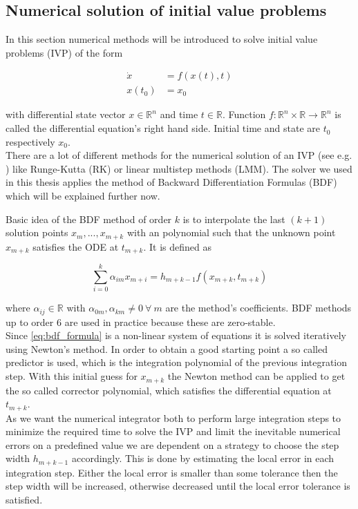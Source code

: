 \documentclass{scrartcl}[12pt, halfparskip]
\numberwithin{equation}{section}
\numberwithin{figure}{section}
\numberwithin{table}{section}
\begin{document}
\subsection{Numerical solution of initial value problems}
\label{sec:theory_ODE_solver_BDF}

In this section numerical methods will be introduced to solve initial value problems (IVP) of the form

\begin{align}
	\dot{x} & = f(x(t),t) \\
	x(t_0) & = x_0 \nonumber
\end{align}

with differential state vector $x \in \mathbb{R}^n$ and time $t \in \mathbb{R}$. Function $f: \mathbb{R}^n \times \mathbb{R} \rightarrow \mathbb{R}^n$ is called the differential equation's right hand side. Initial time and state are $t_0$ respectively $x_0$. \\

There are a lot of different methods for the numerical solution of an IVP (see e.g. \cite{diff_equations_numerics}) like Runge-Kutta (RK) or linear multistep methods (LMM). The solver we used in this thesis applies the method of Backward Differentiation Formulas (BDF) which will be explained further now.

Basic idea of the BDF method of order $k$ is to interpolate the last $(k+1)$ solution points $x_m,...,x_{m+k}$ with an polynomial such that the unknown point $x_{m+k}$ satisfies the ODE at $t_{m+k}$. 
It is defined as

\begin{equation}
	\sum_{i=0}^{k} \alpha_{im} x_{m+i} = h_{m+k-1} f(x_{m+k},t_{m+k})
	\label{eq:bdf_formula}
\end{equation}

where $\alpha_{ij} \in \mathbb{R}$ with $\alpha_{0m},\alpha_{km} \ne 0 \ \forall \ m$ are the method's coefficients. BDF methods up to order 6 are used in practice because these are zero-stable. \\
Since \cref{eq:bdf_formula} is a non-linear system of equations it is solved iteratively using Newton's method. In order to obtain a good starting point a so called predictor is used, which is the integration polynomial of the previous integration step. With this initial guess for $x_{m+k}$ the Newton method can be applied to get the so called corrector polynomial, which satisfies the differential equation at $t_{m+k}$. \\
As we want the numerical integrator both to perform large integration steps to minimize the required time to solve the IVP and limit the inevitable numerical errors on a predefined value we are dependent on a strategy to choose the step width $h_{m+k-1}$ accordingly. This is done by estimating the local error in each integration step. Either the local error is smaller than some tolerance then the step width will be increased, otherwise decreased until the local error tolerance is satisfied. \\
\end{document}
